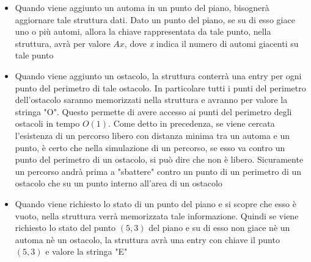 \documentclass[a4paper,11pt]{article}
\begin{document}
\begin{itemize}
    \item Quando viene aggiunto un automa in un punto del piano, bisognerà aggiornare tale struttura dati. Dato un punto del piano, se su di esso giace uno o più automi, allora la chiave rappresentata da tale punto, nella struttura, avrà per valore $Ax$, dove \textit{x} indica il numero di automi giacenti su tale punto

    \item Quando viene aggiunto un ostacolo, la struttura conterrà una entry per ogni punto del perimetro di tale ostacolo. In particolare tutti i punti del perimetro dell'ostacolo saranno memorizzati nella struttura e avranno per valore la stringa "O". Questo permette di avere accesso ai punti del perimetro degli ostacoli in tempo $O(1)$. Come detto in precedenza, se viene cercata l'esistenza di un percorso libero con distanza minima tra un automa e un punto, è certo che nella simulazione di un percorso, se esso va contro un punto del perimetro di un ostacolo, si può dire che non è libero. Sicuramente un percorso andrà prima a "sbattere" contro un punto di un perimetro di un ostacolo che su un punto interno all'area di un ostacolo


    \item Quando viene richiesto lo stato di un punto del piano e si scopre che esso è vuoto, nella struttura verrà memorizzata tale informazione. Quindi se viene richiesto lo stato del punto $(5,3)$ del piano e su di esso non giace nè un automa nè un ostacolo, la struttura avrà una entry con chiave il punto $(5, 3)$ e valore la stringa "E"
\end{itemize}
\end{document}

